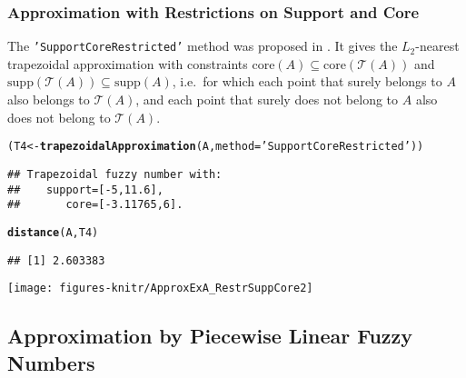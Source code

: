 \documentclass[11pt]{article}\usepackage{graphicx, color}
\makeatletter
\newcommand{\hlfunctioncall}[1]{\textcolor[rgb]{0.501960784313725,0,0.329411764705882}{\textbf{#1}}}%
\newcommand{\hlstring}[1]{\textcolor[rgb]{0.6,0.6,1}{#1}}%
\newenvironment{kframe}{%
 \def\at@end@of@kframe{}%
 \ifinner\ifhmode%
  \def\at@end@of@kframe{\end{minipage}}%
  \begin{minipage}{\columnwidth}%
 \fi\fi%
 \def\FrameCommand##1{\hskip\@totalleftmargin \hskip-\fboxsep
 \colorbox{shadecolor}{##1}\hskip-\fboxsep
     \hskip-\linewidth \hskip-\@totalleftmargin \hskip\columnwidth}%
 \MakeFramed {\advance\hsize-\width
   \@totalleftmargin\z@ \linewidth\hsize
   \@setminipage}}%
 {\par\unskip\endMakeFramed%
 \at@end@of@kframe}
\newenvironment{knitrout}{}{} %
\makeatother
\begin{document}
\subsubsection{Approximation with Restrictions on Support and Core}


The \texttt{'SupportCoreRestricted'} method was proposed in \cite{GrzegorzewskiPasternak2011}.
It gives the $L_2$-nearest trapezoidal approximation with constraints
$\mathrm{core}(A) \subseteq \mathrm{core}(\mathcal{T}(A))$
and $\mathrm{supp}(\mathcal{T}(A)) \subseteq \mathrm{supp}(A)$,
i.e.~for which each point that surely belongs to $A$ also belongs to $\mathcal{T}(A)$,
and each point that surely does not belong to $A$ also does not belong to $\mathcal{T}(A)$.

\begin{knitrout}\small
{}\color{fgcolor}\begin{kframe}
\begin{alltt}
(T4 <- \hlfunctioncall{trapezoidalApproximation}(A, method=\hlstring{'SupportCoreRestricted'}))
\end{alltt}
\begin{verbatim}
## Trapezoidal fuzzy number with:
##    support=[-5,11.6],
##       core=[-3.11765,6].
\end{verbatim}
\begin{alltt}
\hlfunctioncall{distance}(A, T4)
\end{alltt}
\begin{verbatim}
## [1] 2.603383
\end{verbatim}
\end{kframe}
\end{knitrout}


\begin{center}
\begin{knitrout}\small
{}\color{fgcolor}

{\centering \texttt{[image: figures-knitr/ApproxExA\_RestrSuppCore2]} 

}



\end{knitrout}

\end{center}




\subsection{Approximation by Piecewise Linear Fuzzy Numbers}
\end{document}
